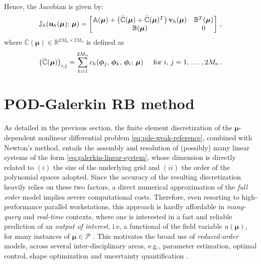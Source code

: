 \documentclass[12pt, a4paper, twoside, openright, notitlepage]{report}
\numberwithin{equation}{chapter}
\theoremstyle{theorem}
\theoremstyle{definition}
\theoremstyle{remark}
\theoremstyle{proposition}
\numberwithin{figure}{chapter}
\newcommand{\bg}[1]{\boldsymbol{#1}}
\begin{document}
		Hence, the Jacobian is given by:
		\begin{equation*}
			\label{eq:ns-jacobian}
			\mathbb{J}_h(\mathbf{u}_h(\bg{\mu}); \, \bg{\mu}) =
			\begin{bmatrix}
			\hspace*{-0.15cm}
			\begin{array}{cc} 
				\mathbb{A}(\bg{\mu}) + \big( \bar{\mathbb{C}}(\bg{\mu}) + \bar{\mathbb{C}}(\bg{\mu})^T \big) \, \mathbf{v}_h(\bg{\mu}) & \mathbb{B}^T(\bg{\mu}) \\
				\mathbb{B}(\bg{\mu}) & 0
			\end{array} 
			\hspace*{-0.15cm}
			\end{bmatrix} \, ,
		\end{equation*}
		where $\bar{\mathbb{C}}(\bg{\mu}) \in \mathbb{R}^{2 M_n \times 2 M_n}$ is defined as
		\begin{equation*}
			\big( \bar{\mathbb{C}}(\bg{\mu}) \big)_{i,j} = \sum_{k = 1}^{2 M_n} c_h(\bg{\phi}_j, \, \bg{\phi}_k, \, \bg{\phi}_i; \, \bg{\mu}) \hspace*{0.5cm} \text{for $i, \, j = 1, \, \ldots \, , 2 M_n$} \, .
		\end{equation*}
		
	\vspace*{0.1cm}
		
	\section{POD-Galerkin RB method}
	\label{section:POD-Galerkin reduced basis method}
		
		As detailed in the previous section, the finite element discretization of the $\bg{\mu}$-dependent nonlinear differential problem \eqref{eq:pde-weak-reference}, combined with Newton's method, entails the assembly and resolution of (possibly) many linear systems of the form \eqref{eq:galerkin-linear-system}, whose dimension is directly related to $(i)$ the size of the underlying grid and $(ii)$ the order of the polynomial spaces adopted. Since the accuracy of the resulting discretization heavily relies on these two factors, a direct numerical approximation of the \emph{full order} model implies severe computational costs. Therefore, even resorting to high-performance parallel workstations, this approach is hardly affordable in \emph{many-query} and \emph{real-time} contexts, where one is interested in a fast and reliable prediction of an \emph{output of interest}, i.e, a functional of the field variable $u(\bg{\mu})$, for many instances of $\bg{\mu} \in \mathcal{P}$ \cite{Dep08}. This motivates the broad use of \emph{reduced-order} models, across several inter-disciplinary areas, e.g., parameter estimation, optimal control, shape optimization and uncertainty quantification \cite{HSR16, QMN15}. 
		
\end{document}
